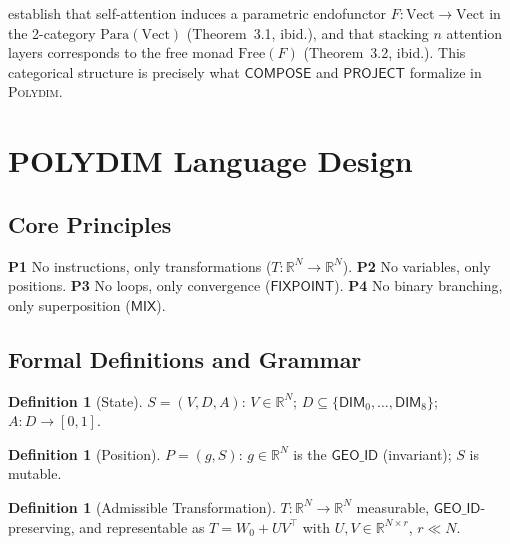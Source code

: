 \documentclass[10pt,twocolumn]{article}
\theoremstyle{plain}
\theoremstyle{definition}
\newtheorem{definition}[theorem]{Definition}
\theoremstyle{remark}
\newcommand{\RR}{\mathbb{R}}
\newcommand{\Compose}{\mathsf{COMPOSE}}
\newcommand{\Mix}{\mathsf{MIX}}
\newcommand{\Fixpoint}{\mathsf{FIXPOINT}}
\newcommand{\Project}{\mathsf{PROJECT}}
\newcommand{\GeoID}{\mathsf{GEO\_ID}}
\begin{document}
\citet{oneill2025endofunctor} establish that self-attention induces a
parametric endofunctor $F\colon \mathrm{Vect} \to \mathrm{Vect}$ in the
2-category $\mathrm{Para}(\mathrm{Vect})$ (Theorem~3.1, ibid.), and that
stacking $n$ attention layers corresponds to the free monad $\mathrm{Free}(F)$
(Theorem~3.2, ibid.). This categorical structure is precisely what
$\Compose$ and $\Project$ formalize in \textsc{Polydim}.

\section{POLYDIM Language Design}

\subsection{Core Principles}

\textbf{P1} No instructions, only transformations ($T\colon\RR^N\to\RR^N$).
\textbf{P2} No variables, only positions.
\textbf{P3} No loops, only convergence ($\Fixpoint$).
\textbf{P4} No binary branching, only superposition ($\Mix$).

\subsection{Formal Definitions and Grammar}

\begin{definition}[State]
$S=(V,D,A)$: $V\in\RR^N$; $D\subseteq\{\mathsf{DIM}_0,\ldots,\mathsf{DIM}_8\}$;
$A\colon D\to[0,1]$.
\end{definition}

\begin{definition}[Position]
$P=(g,S)$: $g\in\RR^N$ is the $\GeoID$ (invariant); $S$ is mutable.
\end{definition}

\begin{definition}[Admissible Transformation]
$T\colon\RR^N\to\RR^N$ measurable, $\GeoID$-preserving,
and representable as $T=W_0+UV^\top$ with $U,V\in\RR^{N\times r}$, $r\ll N$.
\end{definition}
\end{document}
